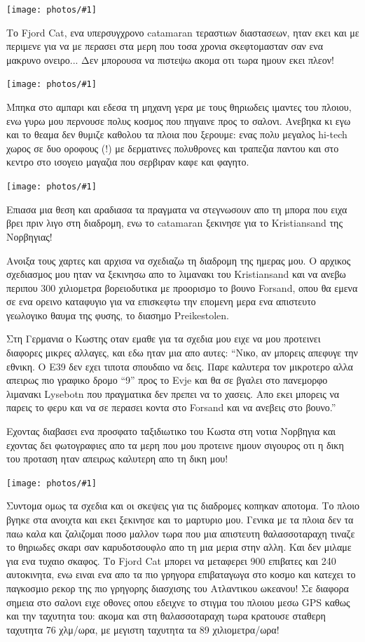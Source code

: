 \documentclass[11pt, letterpaper]{book}
\newcommand\photo[1]{\begin{center}\noindent\texttt{[image: photos/\#1]}\end{center}}
\begin{document}
\photo{143.jpg}

Το Fjord Cat, ενα υπερσυγχρονο catamaran τεραστιων διαστασεων, ηταν εκει και με περιμενε για να με περασει στα μερη που τοσα χρονια σκεφτομασταν σαν ενα μακρυνο ονειρο... Δεν μπορουσα να πιστεψω ακομα οτι τωρα ημουν εκει πλεον!

\photo{144.jpg}

Μπηκα στο αμπαρι και εδεσα τη μηχανη γερα με τους θηριωδεις ιμαντες του πλοιου, ενω γυρω μου περνουσε πολυς κοσμος που πηγαινε προς το σαλονι. Ανεβηκα κι εγω και το θεαμα δεν θυμιζε καθολου τα πλοια που ξερουμε: ενας πολυ μεγαλος hi-tech χωρος σε δυο οροφους (!) με δερματινες πολυθρονες και τραπεζια παντου και στο κεντρο στο ισογειο μαγαζια που σερβιραν καφε και φαγητο.

\photo{145.jpg}

Επιασα μια θεση και αραδιασα τα πραγματα να στεγνωσουν απο τη μπορα που ειχα βρει πριν λιγο στη διαδρομη, ενω το catamaran ξεκινησε για το Kristiansand της Νορβηγιας! 

Ανοιξα τους χαρτες και αρχισα να σχεδιαζω τη διαδρομη της ημερας μου. Ο αρχικος σχεδιασμος μου ηταν να ξεκινησω απο το λιμανακι του Kristiansand και να ανεβω περιπου 300 χιλιομετρα βορειοδυτικα με προορισμο το βουνο Forsand, οπου θα εμενα σε ενα ορεινο καταφυγιο για να επισκεφτω την επομενη μερα ενα απιστευτο γεωλογικο θαυμα της φυσης, το διασημο Preikestolen. 

Στη Γερμανια ο Κωστης οταν εμαθε για τα σχεδια μου ειχε να μου προτεινει διαφορες μικρες αλλαγες, και εδω ηταν μια απο αυτες: ``Νικο, αν μπορεις απεφυγε την εθνικη. Ο Ε39 δεν εχει τιποτα σπουδαιο να δεις. Παρε καλυτερα τον μικροτερο αλλα απειρως πιο γραφικο δρομο ``9'' προς το Evje και θα σε βγαλει στο πανεμορφο λιμανακι Lysebotn που πραγματικα δεν πρεπει να το χασεις. Απο εκει μπορεις να παρεις το φερυ και να σε περασει κοντα στο Forsand και να ανεβεις στο βουνο.''

Εχοντας διαβασει ενα προσφατο ταξιδιωτικο του Κωστα στη νοτια Νορβηγια και εχοντας δει φωτογραφιες απο τα μερη που μου προτεινε ημουν σιγουρος οτι η δικη του προταση ηταν απειρως καλυτερη απο τη δικη μου!

\photo{146.jpg}

Συντομα ομως τα σχεδια και οι σκεψεις για τις διαδρομες κοπηκαν αποτομα. Το πλοιο βγηκε στα ανοιχτα και εκει ξεκινησε και το μαρτυριο μου. Γενικα με τα πλοια δεν τα παω καλα και ζαλιζομαι ποσο μαλλον τωρα που μια απιστευτη θαλασσοταραχη τιναζε το θηριωδες σκαρι σαν καρυδοτσουφλο απο τη μια μερια στην αλλη. 
Και δεν μιλαμε για ενα τυχαιο σκαφος. Το Fjord Cat μπορει να μεταφερει 900 επιβατες και 240 αυτοκινητα, ενω ειναι ενα απο τα πιο γρηγορα επιβαταγωγα στο κοσμο και κατεχει το παγκοσμιο ρεκορ της πιο γρηγορης διασχισης του Ατλαντικου ωκεανου!
Σε διαφορα σημεια στο σαλονι ειχε οθονες οπου εδειχνε το στιγμα του πλοιου μεσω GPS καθως και την ταχυτητα του: ακομα και στη θαλασσοταραχη τωρα κρατουσε σταθερη ταχυτητα 76 χλμ/ωρα, με μεγιστη ταχυτητα τα 89 χιλιομετρα/ωρα!
\end{document}
